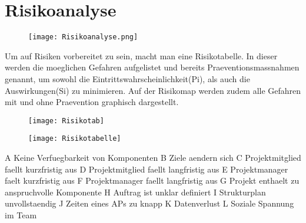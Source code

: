 \section{Risikoanalyse}
\begin{figure}[H]
	\centering
	\texttt{[image: Risikoanalyse.png]}
	\label{fig:Risikoanalyse}
\end{figure}

\newpage
Um auf Risiken vorbereitet zu sein, macht man eine Risikotabelle. In dieser werden die moeglichen Gefahren aufgelistet und bereits Praeventionsmassnahmen genannt, um sowohl die Eintrittswahrscheinlichkeit(Pi), als auch die Auswirkungen(Si) zu minimieren. Auf der Risikomap werden zudem alle Gefahren mit und ohne Praevention graphisch dargestellt.

\begin{figure}[H]
	\centering
	\texttt{[image: Risikotab]}
	\label{fig:Risikodiagramm}
\end{figure}

\begin{figure}[H]
	\centering
	\texttt{[image: Risikotabelle]}
	\label{fig:Tabelle}
\end{figure}
A 	Keine Verfuegbarkeit von Komponenten \newline 
B 	Ziele aendern sich\newline 
C 	Projektmitglied faellt kurzfristig aus\newline 
D	Projektmitglied faellt langfristig aus\newline 
E 	Projektmanager faelt kurzfristig aus\newline 
F 	Projektmanager faellt langfristig aus\newline 
G	Projekt enthaelt zu anspruchvolle Komponente\newline 
H	Auftrag ist unklar definiert\newline 
I	Strukturplan unvollstaendig\newline 
J	Zeiten eines APs zu knapp\newline 
K	Datenverlust\newline 
L	Soziale Spannung im Team\newline 
